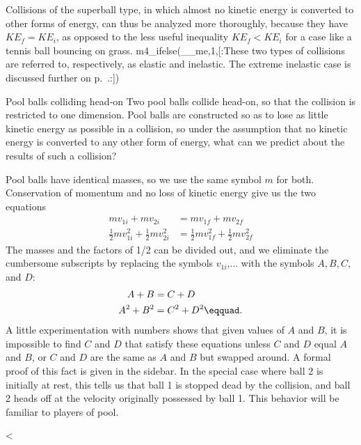 Collisions of the superball type, in which almost no kinetic
energy is converted to other forms of energy, can thus be
analyzed more thoroughly, because they have $KE_f=KE_i$, as
opposed to the less useful inequality $KE_f<KE_i$ for a
case like a tennis ball bouncing on grass.\label{elastic-and-inelastic}
m4_ifelse(__me,1,[:These two types of collisions are referred to, respectively, as elastic
and inelastic.
The extreme inelastic case is discussed further on p.~\pageref{subsubsec:totally-inelastic}.:])

\begin{eg}{Pool balls colliding head-on}\label{eg:pool-balls}
\egquestion Two pool balls collide head-on, so that the
collision is restricted to one dimension. Pool balls are
constructed so as to lose as little kinetic energy as
possible in a collision, so under the assumption that no
kinetic energy is converted to any other form of energy,
what can we predict about the results of such a collision?

\eganswer Pool balls have identical masses, so we use the
same symbol $m$ for both. Conservation of momentum and no loss
of kinetic energy give us the two equations
\begin{align*}
  mv_{1i}+mv_{2i} &=  mv_{1f}+mv_{2f} \\
  \frac{1}{2}mv_{1i}^2+\frac{1}{2}mv_{2i}^2 &=  \frac{1}{2}mv_{1f}^2+\frac{1}{2}mv_{2f}^2
\end{align*}
The masses and the factors of 1/2 can be divided out, and we
eliminate the cumbersome subscripts by replacing the symbols
$v_{1i}$,... with the symbols $A,B,C$, and $D$:
\begin{align*}
 A+B &= C+D \\
 A^2+B^2 &= C^2+D^2\eqquad.
\end{align*}
A little experimentation with numbers shows that given
values of $A$ and $B$, it is impossible to find $C$ and $D$
that satisfy these equations unless $C$ and $D$ equal $A$
and $B$, or $C$ and $D$ are the same as $A$ and $B$ but
swapped around. A formal proof of this fact is given in the
sidebar.
In the special case where ball 2 is initially at
rest, this tells us that ball 1 is stopped dead by the
collision, and ball 2 heads off at the velocity originally
possessed by ball 1. This behavior will be familiar to players of pool.
\end{eg}
<%
